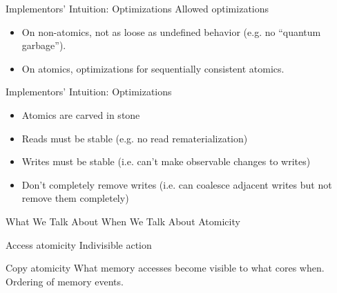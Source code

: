 \documentclass{beamer}
\begin{document}
\begin{frame}{Implementors' Intuition: Optimizations}
  Allowed optimizations

  \begin{itemize}
  \item On non-atomics, not as loose as undefined behavior (e.g. no ``quantum garbage'').
  \item On atomics, optimizations for sequentially consistent atomics.
  \end{itemize}

\end{frame}

\begin{frame}{Implementors' Intuition: Optimizations}
  \begin{itemize}
  \item Atomics are carved in stone
  \item Reads must be stable (e.g. no read rematerialization)
  \item Writes must be stable (i.e. can't make observable changes to writes)
  \item Don't completely remove writes (i.e. can coalesce adjacent writes but not remove them completely)
  \end{itemize}

\end{frame}

\begin{frame}{What We Talk About When We Talk About Atomicity}

  \begin{block}{Access atomicity}
    Indivisible action
  \end{block}

  \pause

  \begin{block}{Copy atomicity}
    What memory accesses become visible to what cores when. Ordering of memory events.
  \end{block}

\end{frame}
\end{document}
